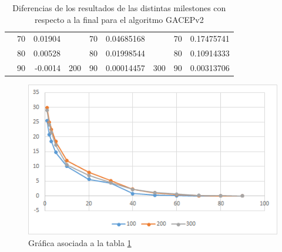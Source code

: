 \begin{table}[h]
\begin{tabular}{|ccrccrccr|}
\rowcolor[HTML]{DAE8FC} 
\multicolumn{1}{|c|}{\cellcolor[HTML]{FFFFC7}}                       & \multicolumn{1}{c|}{\cellcolor[HTML]{DAE8FC}70}        & \multicolumn{1}{r|}{\cellcolor[HTML]{DAE8FC}0.01904}    & \multicolumn{1}{c|}{\cellcolor[HTML]{FFFFC7}}                       & \multicolumn{1}{c|}{\cellcolor[HTML]{DAE8FC}70}        & \multicolumn{1}{r|}{\cellcolor[HTML]{DAE8FC}0.04685168} & \multicolumn{1}{c|}{\cellcolor[HTML]{FFFFC7}}                       & \multicolumn{1}{c|}{\cellcolor[HTML]{DAE8FC}70}        & 0.17475741                                              \\ \cline{2-3} \cline{5-6} \cline{8-9} 
\rowcolor[HTML]{DDFDFF} 
\multicolumn{1}{|c|}{\cellcolor[HTML]{FFFFC7}}                       & \multicolumn{1}{c|}{\cellcolor[HTML]{DDFDFF}80}        & \multicolumn{1}{r|}{\cellcolor[HTML]{DDFDFF}0.00528}    & \multicolumn{1}{c|}{\cellcolor[HTML]{FFFFC7}}                       & \multicolumn{1}{c|}{\cellcolor[HTML]{DDFDFF}80}        & \multicolumn{1}{r|}{\cellcolor[HTML]{DDFDFF}0.01998544} & \multicolumn{1}{c|}{\cellcolor[HTML]{FFFFC7}}                       & \multicolumn{1}{c|}{\cellcolor[HTML]{DDFDFF}80}        & 0.10914333                                              \\ \cline{2-3} \cline{5-6} \cline{8-9} 
\rowcolor[HTML]{DAE8FC} 
\multicolumn{1}{|c|}{\multirow{-13}{*}{\cellcolor[HTML]{FFFFC7}100}} & \multicolumn{1}{c|}{\cellcolor[HTML]{DAE8FC}90}        & \multicolumn{1}{r|}{\cellcolor[HTML]{DAE8FC}-0.0014}    & \multicolumn{1}{c|}{\multirow{-13}{*}{\cellcolor[HTML]{FFFFC7}200}} & \multicolumn{1}{c|}{\cellcolor[HTML]{DAE8FC}90}        & \multicolumn{1}{r|}{\cellcolor[HTML]{DAE8FC}0.00014457} & \multicolumn{1}{c|}{\multirow{-13}{*}{\cellcolor[HTML]{FFFFC7}300}} & \multicolumn{1}{c|}{\cellcolor[HTML]{DAE8FC}90}        & 0.00313706                                              \\ \hline
\end{tabular}
\caption{\label{DiferenciasGACEP_GRASP}Diferencias de los resultados de las distintas milestones con respecto a la final para el algoritmo GACEPv2}
\end{table}

\begin{figure}[h]
		\centering
		\includegraphics[scale=1]{imagenes/Experimental/DiferenciasGACEP_GRASP.png}
        \caption{Gráfica asociada a la tabla \ref{DiferenciasGACEP_GRASP}}
        \label{fig:DiferenciasGACEP}
\end{figure}

